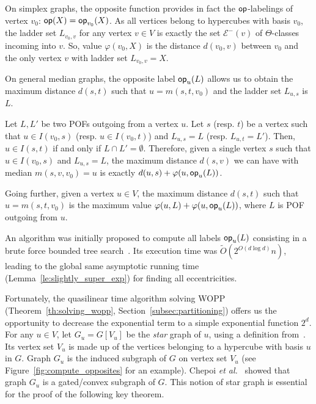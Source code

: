 \documentclass[a4paper,UKenglish,numberwithinsect,cleveref, autoref]{lipics-v2021}
\newcommand{\opp}{\mbox{\textsf{op}}}
\begin{document}
On simplex graphs, the opposite function provides in fact the $\opp$-labelings of vertex $v_0$: $\opp(X) = \opp_{v_0}(X)$. As all vertices belong to hypercubes with basis $v_0$, the ladder set $L_{v_0,v}$ for any vertex $v\in V$ is exactly the set $\mathcal{E}^-(v)$ of $\Theta$-classes incoming into $v$. So, value $\varphi(v_0,X)$ is the distance $d(v_0,v)$ between $v_0$ and the only vertex $v$ with ladder set $L_{v_0,v} = X$.

On general median graphs, the opposite label $\opp_u(L)$ allows us to obtain the maximum distance $d(s,t)$ such that $u = m(s,t,v_0)$ and the ladder set $L_{u,s}$ is $L$.

\begin{lemma}
Let $L,L'$ be two POFs outgoing from a vertex $u$. Let $s$ (resp. $t$) be a vertex such that $u \in I(v_0,s)$ (resp. $u \in I(v_0,t)$) and $L_{u,s} = L$ (resp. $L_{u,t} = L'$). Then, $u \in I(s,t)$ if and only if $L \cap L' = \emptyset$. Therefore, given a single vertex $s$ such that $u \in I(v_0,s)$ and $L_{u,s} = L$, the maximum distance $d(s,v)$ we can have with median $m(s,v,v_0) = u$ is exactly $d(u,s)+\varphi(u,\opp_u(L))$.
\label{le:property_opp}
\end{lemma}

Going further, given a vertex $u \in V$, the maximum distance $d(s,t)$ such that $u = m(s,t,v_0)$ is the maximum value $\varphi(u,L) + \varphi(u,\opp_u(L))$, where $L$ is POF outgoing from $u$.

An algorithm was initially proposed to compute all labels $\opp_u(L)$ consisting in a brute force bounded tree search~\cite{BeHa21}. Its execution time was $\tilde{O}(2^{O(d\log d)}n)$, leading to the global same asymptotic running time (Lemma~\ref{le:slightly_super_exp}) for finding all eccentricities.

Fortunately, the quasilinear time algorithm solving WOPP (Theorem~\ref{th:solving_wopp}, Section~\ref{subsec:partitioning}) offers us the opportunity to decrease the exponential term to a simple exponential function $2^d$. For any $u \in V$, let $G_u =  G\left[V_u\right]$ be the \textit{star} graph of $u$, using a definition from~\cite{ChLaRa19}. Its vertex set $V_u$ is made up of the vertices belonging to a hypercube with basis $u$ in $G$. Graph $G_u$ is the induced subgraph of $G$ on vertex set $V_u$ (see Figure~\ref{fig:compute_opposites} for an example). Chepoi {\em et al.}~\cite{ChLaRa19} showed that graph $G_u$ is a gated/convex subgraph of $G$. This notion of star graph is essential for the proof of the following key theorem.
\end{document}
